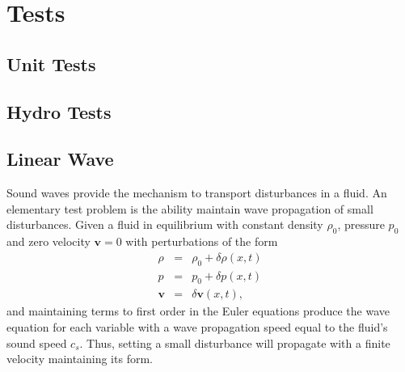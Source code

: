 \section{Tests}
\subsection{Unit Tests}

\subsection{Hydro Tests}
\subsection{Linear Wave}
Sound waves provide the mechanism to transport disturbances in a fluid. An
elementary test problem is the ability maintain wave propagation of small
disturbances. Given a fluid in equilibrium with constant density $\rho_0$,
pressure $p_0$ and zero velocity $\mathbf{v}=0$ with perturbations of the form
\begin{equation}
	\begin{array}{rcl}
		\rho & = & \rho_0 + \delta\rho(x,t) \\
   		 p & = & p_0 + \delta p(x,t) \\
    	\mathbf{v} & = & \delta\mathbf{v}(x,t),
    \end{array}
\end{equation}
and maintaining terms to first order in the Euler equations produce the wave
equation for each variable with a wave propagation speed equal to the fluid's sound speed 
$c_s$. Thus, setting a small disturbance 
will propagate with a finite velocity maintaining its form.

